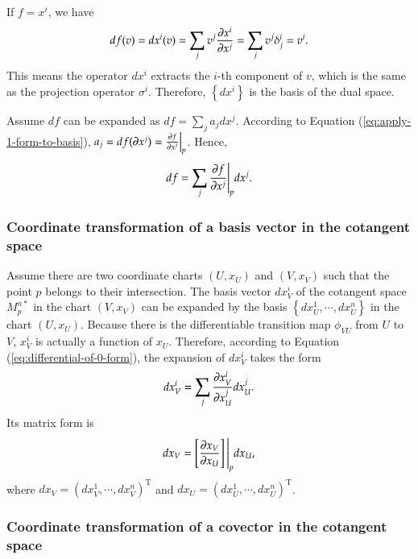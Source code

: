 \documentclass[11pt, a4paper]{book}
\begin{document}
If $f=x^i$, we have
\begin{equation*}
  df(v) = dx^i(v) = \sum_j v^j \frac{\partial x^{i}}{\partial x^j} = \sum_j v^j \delta^i_j = v^i.
\end{equation*}
This means the operator $dx^i$ extracts the $i$-th component of $v$, which is the same as
the projection operator $\sigma^i$. Therefore, $\left\{ dx^i \right\}$ is the basis of the
dual space.

Assume $df$ can be expanded as $df = \sum_j a_j dx^j$. According to Equation
(\ref{eq:apply-1-form-to-basis}),
$a_j = df(\boldsymbol{\partial}x^j) = \frac{\partial f}{\partial x^j} \Big\vert_p$. Hence,
\begin{equation}
  \label{eq:differential-of-0-form}
  df = \sum_j \frac{\partial f}{\partial x^j}\Bigg\vert_p dx^j.
\end{equation}

\subsubsection{Coordinate transformation of a basis vector in the cotangent space}

Assume there are two coordinate charts $(U,x_U)$ and $(V,x_V)$ such that the point $p$
belongs to their intersection. The basis vector $dx_V^{i}$ of the cotangent space
$M_p^{n*}$ in the chart $(V,x_V)$ can be expanded by the basis
$\left\{ dx_U^1,\cdots,dx_U^n \right\}$ in the chart $(U,x_U)$. Because there is the
differentiable transition map $\phi_{VU}$ from $U$ to $V$, $x_V^i$ is actually a function
of $x_U$. Therefore, according to Equation (\ref{eq:differential-of-0-form}), the
expansion of $dx_V^i$ takes the form
\begin{equation}
  \label{eq:cotangent-basis-transformation}
  dx_V^i=\sum_j \frac{\partial x_V^i}{\partial x_U^j} dx_U^j.
\end{equation}
Its matrix form is
\begin{equation}
  dx_V = \left[ \frac{\partial x_V}{\partial x_U} \right]\Bigg\vert_p dx_U,
\end{equation}
where $dx_V = (dx_V^1,\cdots,dx_V^n)^{\mathrm{T}}$ and $dx_U = (dx_U^1,\cdots,dx_U^n)^{\mathrm{T}}$.


\subsubsection{Coordinate transformation of a covector in the cotangent space}
\label{sec:covector-transformation}
\end{document}
